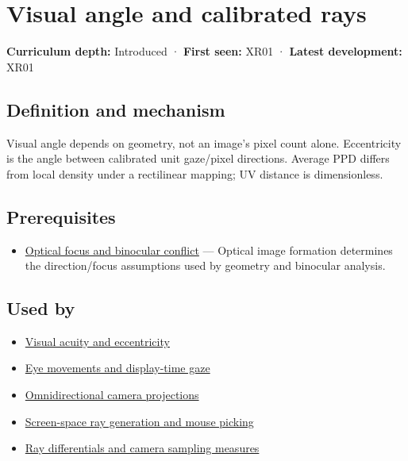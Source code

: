 \hypertarget{appendix-7d356c396d1a}{}\label{referencestart:appendix-7d356c396d1a}
\section{Visual angle and calibrated rays}\label{appendix-7d356c396d1a-visual-angle-and-calibrated-rays}

\textbf{Curriculum depth:} Introduced · \textbf{First seen:} XR01 · \textbf{Latest development:} XR01

\subsection{Definition and mechanism}\label{appendix-7d356c396d1a-definition-and-mechanism}

Visual angle depends on geometry, not an image's pixel count alone. Eccentricity is the angle between calibrated unit gaze/pixel directions. Average PPD differs from local density under a rectilinear mapping; UV distance is dimensionless.

\subsection{Prerequisites}\label{appendix-7d356c396d1a-prerequisites}

\begin{itemize}
\tightlist
\item
  \hyperref[appendix-f90cee1be7a4]{Optical focus and binocular conflict} --- Optical image formation determines the direction/focus assumptions used by geometry and binocular analysis.
\end{itemize}

\subsection{Used by}\label{appendix-7d356c396d1a-used-by}

\begin{itemize}
\item
  \hyperref[appendix-b491fc48c54b]{Visual acuity and eccentricity}
\item
  \hyperref[appendix-a6f2c4fe1996]{Eye movements and display-time gaze}
\item
  \hyperref[appendix-fc99ad39f351]{Omnidirectional camera projections}
\item
  \hyperref[appendix-f1a6d43e80d1]{Screen-space ray generation and mouse picking}
\item
  \hyperref[appendix-8c40fad29462]{Ray differentials and camera sampling measures}
\end{itemize}


